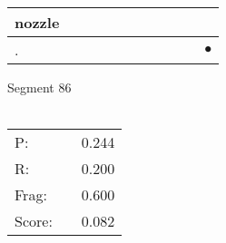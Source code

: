 \documentclass[landscape]{article}
\newcommand{\ssp}{\hspace{2pt}}
\newcommand{\mex}{\cellcolor{g}$\bullet$}
\begin{document}
\begin{tabular}{|l|p{10pt}|p{10pt}|p{10pt}|p{10pt}|p{10pt}|p{10pt}|p{10pt}|p{10pt}|p{10pt}|p{10pt}|}
\hline
\ssp nozzle \ssp&\hspace{2pt}&\hspace{2pt}&\hspace{2pt}&\hspace{2pt}&\hspace{2pt}&\hspace{2pt}&\hspace{2pt}&\hspace{2pt}&\hspace{2pt}&\hspace{2pt}\\
\hline
\ssp \cellcolor{ref9}. \ssp&\hspace{2pt}&\hspace{2pt}&\hspace{2pt}&\hspace{2pt}&\hspace{2pt}&\hspace{2pt}&\hspace{2pt}&\hspace{2pt}&\hspace{2pt}&\hspace{2pt}\mex\\
\hline
\end{tabular}

\vspace{6pt}
\noindent Segment 86\\\\
\noindent\begin{tabular}{lm{12pt}r}
\hline
P:&&0.244\\
R:&&0.200\\
Frag:&&0.600\\
Score:&&0.082\\
\end{tabular}

\newpage
\end{document}

